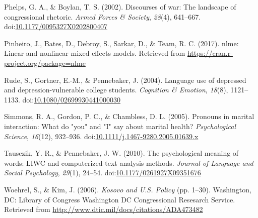 \documentclass[english,,man]{apa6}
\theoremstyle{definition}
\theoremstyle{definition}
\theoremstyle{definition}
\theoremstyle{remark}
\begin{document}
\leavevmode\hypertarget{ref-Phelps2002}{}%
Phelps, G. A., \& Boylan, T. S. (2002). Discourses of war: The landscape
of congressional rhetoric. \emph{Armed Forces \& Society}, \emph{28}(4),
641--667.
doi:\href{https://doi.org/10.1177/0095327X0202800407}{10.1177/0095327X0202800407}

\leavevmode\hypertarget{ref-Pinheiro2017}{}%
Pinheiro, J., Bates, D., Debroy, S., Sarkar, D., \& Team, R. C. (2017).
nlme: Linear and nonlinear mixed effects models. Retrieved from
\url{https://cran.r-project.org/package=nlme}

\leavevmode\hypertarget{ref-Rude2004}{}%
Rude, S., Gortner, E.-M., \& Pennebaker, J. (2004). Language use of
depressed and depression-vulnerable college students. \emph{Cognition \&
Emotion}, \emph{18}(8), 1121--1133.
doi:\href{https://doi.org/10.1080/02699930441000030}{10.1080/02699930441000030}

\leavevmode\hypertarget{ref-Simmons2005}{}%
Simmons, R. A., Gordon, P. C., \& Chambless, D. L. (2005). Pronouns in
marital interaction: What do "you" and "I" say about marital health?
\emph{Psychological Science}, \emph{16}(12), 932--936.
doi:\href{https://doi.org/10.1111/j.1467-9280.2005.01639.x}{10.1111/j.1467-9280.2005.01639.x}

\leavevmode\hypertarget{ref-Tausczik2010}{}%
Tausczik, Y. R., \& Pennebaker, J. W. (2010). The psychological meaning
of words: LIWC and computerized text analysis methods. \emph{Journal of
Language and Social Psychology}, \emph{29}(1), 24--54.
doi:\href{https://doi.org/10.1177/0261927X09351676}{10.1177/0261927X09351676}

\leavevmode\hypertarget{ref-Woehrel2006}{}%
Woehrel, S., \& Kim, J. (2006). \emph{Kosovo and U.S. Policy} (pp.
1--30). Washington, DC: Library of Congress Washington DC Congressional
Resesarch Service. Retrieved from
\url{http://www.dtic.mil/docs/citations/ADA473482}
\end{document}

